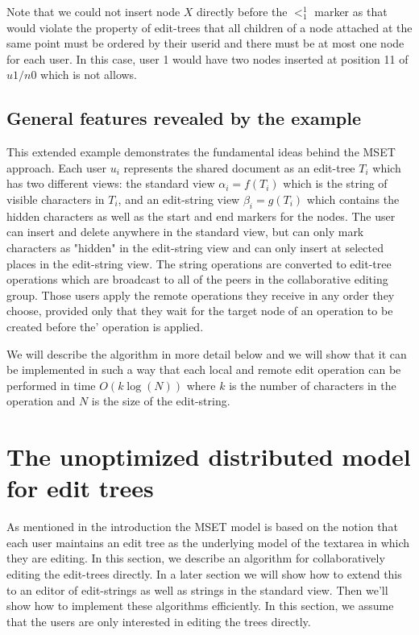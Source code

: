 \documentclass{amsart}
\begin{document}
Note that we could not insert node $X$ directly before the $<^1_1$ marker
as that would violate the property of edit-trees that all children of a
node attached at the same point must be ordered by their userid and there
must be at most one node for each user. In this case, user 1 would have two
nodes inserted at position 11 of $u1/n0$ which is not allows.

\subsection{General features revealed by the example}
This extended example demonstrates the fundamental ideas behind the MSET
approach. Each user $u_i$ represents the shared document as an edit-tree $T_i$
which has two different views: the standard view $\alpha_i = f(T_i)$ which
is the string of visible characters in $T_i$, and an edit-string view
$\beta_i = g(T_i)$ which contains the hidden characters as well as the
start and end markers for the nodes. The user can insert and delete anywhere
in the standard view, but can only mark characters as "hidden" in the
edit-string view and can only insert at selected places in the edit-string
view. The string operations are converted to edit-tree operations which are
broadcast to all of the peers in the collaborative editing group. Those users
apply the remote operations they receive in any order they choose, provided only
that they wait for the target node of an operation to be created before the'
operation is applied.

We will describe the algorithm in more detail below and we will show that it
can be implemented in such a way that each local and remote edit operation
can be performed in time $O(k\log(N))$ where $k$ is the number of characters
in the operation and $N$ is the size of the edit-string.

\newpage

\section{The unoptimized distributed model for edit trees}

As mentioned in the introduction the MSET model is based on the notion that 
each user maintains an edit tree as the underlying model of the textarea in
which they are editing. In this section, we describe an algorithm for 
collaboratively editing the edit-trees directly. In a later section we will show
how to extend this to an editor of edit-strings as well as strings in
the standard view. Then we'll show how to implement these algorithms
efficiently. In this section, we assume that the users are only interested in editing
the trees directly.
\end{document}
